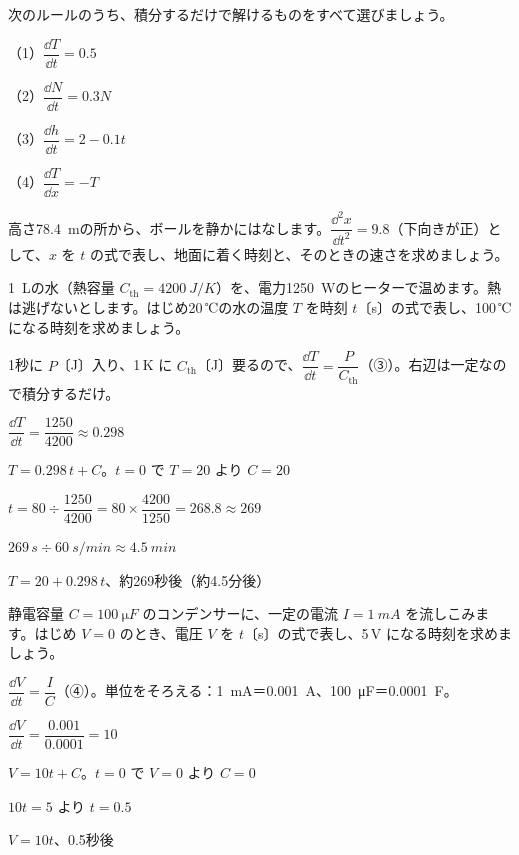 \begingroup{}%
\noindent\begin{minipage}[t]{0.49\linewidth}
\begin{jibun}
\raggedright 次のルールのうち、積分するだけで解けるものをすべて選びましょう。\par
（1）$\dfrac{\dd T}{\dd t}=0.5$\par
（2）$\dfrac{\dd N}{\dd t}=0.3N$\par
（3）$\dfrac{\dd h}{\dd t}=2-0.1t$\par
（4）$\dfrac{\dd T}{\dd x}=-T$
\end{jibun}
\end{minipage}\hfill
\begin{minipage}[t]{0.49\linewidth}
\begin{jibun}
\raggedright 高さ\qty{78.4}{m}の所から、ボールを静かにはなします。$\dfrac{\dd^2x}{\dd t^2}=9.8$（下向きが正）として、$x$ を $t$ の式で表し、地面に着く時刻と、そのときの速さを求めましょう。
\end{jibun}
\end{minipage}\par
\endgroup

\begin{reidai}[ヒーターで温める]
\qty{1}{L}の水（熱容量 $C_{\mathrm{th}}=\qty{4200}{J/K}$）を、電力\qty{1250}{W}のヒーターで温めます。熱は逃げないとします。はじめ20\,℃の水の温度 $T$ を時刻 $t$〔s〕の式で表し、100\,℃になる時刻を求めましょう。\par
\kangaekata 1秒に $P$〔J〕入り、1\,K に $C_{\mathrm{th}}$〔J〕要るので、$\dfrac{\dd T}{\dd t}=\dfrac{P}{C_{\mathrm{th}}}$（③）。右辺は一定なので積分するだけ。\par
\shiki $\dfrac{\dd T}{\dd t}=\dfrac{1250}{4200}\approx0.298$\par
\bkvidl $T=0.298\,t+C$。$t=0$ で $T=20$ より $C=20$\par
\bkvidl $t=80\div\dfrac{1250}{4200}=80\times\dfrac{4200}{1250}=268.8\approx269$\par
\bkvidl $269\,\unit{s}\div\qty{60}{s/min}\approx\qty{4.5}{min}$\par
\kotae $T=20+0.298\,t$、約269秒後（約4.5分後）
\end{reidai}

\begin{reidai}[一定の電流でコンデンサーに電気をためる]
静電容量 $C=\qty{100}{\micro F}$ のコンデンサーに、一定の電流 $I=\qty{1}{mA}$ を流しこみます。はじめ $V=0$ のとき、電圧 $V$ を $t$〔s〕の式で表し、5\,V になる時刻を求めましょう。\par
\kangaekata $\dfrac{\dd V}{\dd t}=\dfrac{I}{C}$（④）。単位をそろえる：\qty{1}{mA}＝\qty{0.001}{A}、\qty{100}{\micro F}＝\qty{0.0001}{F}。\par
\shiki $\dfrac{\dd V}{\dd t}=\dfrac{0.001}{0.0001}=10$\par
\bkvidl $V=10t+C$。$t=0$ で $V=0$ より $C=0$\par
\bkvidl $10t=5$ より $t=0.5$\par
\kotae $V=10t$、0.5秒後
\end{reidai}

